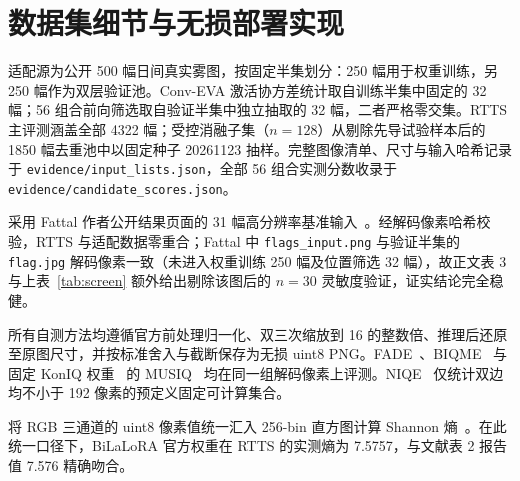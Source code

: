 \documentclass[10pt,twocolumn,letterpaper]{article}
\begin{document}
\begin{table}[H]\centering\small\setlength{\tabcolsep}{2pt}

\caption{剔除已知验证重合图 \texttt{flags\_input.png} 后的 Fattal（$n=30$）灵敏度复核结果（三种子均值$\pm$样本标准差），所有指标优势方向与 $n=31$ 完全一致。}
\label{tab:screen}
\end{table}

\clearpage
\begin{table}[H]\centering\small\setlength{\tabcolsep}{2pt}

\caption{Course-10 课程指定 10 幅真实雾图的逐图定量明细（统一无损 uint8 PNG 评测口径）。\method~在全部 10 幅图像上均取得最低残雾 FADE，并在重雾样例 \texttt{neighbour} 与 \texttt{tiananmen} 上明显优于各对比基线。}
\label{tab:course10full}
\end{table}

\clearpage
\section{数据集细节与无损部署实现}
适配源为公开 500 幅日间真实雾图，按固定半集划分：250 幅用于权重训练，另 250 幅作为双层验证池。Conv-EVA 激活协方差统计取自训练半集中固定的 32 幅；56 组合前向筛选取自验证半集中独立抽取的 32 幅，二者严格零交集。RTTS 主评测涵盖全部 4322 幅；受控消融子集（$n=128$）从剔除先导试验样本后的 1850 幅去重池中以固定种子 20261123 抽样。完整图像清单、尺寸与输入哈希记录于 \texttt{evidence/input\_lists.json}，全部 56 组合实测分数收录于 \texttt{evidence/candidate\_scores.json}。

采用 Fattal 作者公开结果页面的 31 幅高分辨率基准输入~\cite{fattal2014}。经解码像素哈希校验，RTTS 与适配数据零重合；Fattal 中 \texttt{flags\_input.png} 与验证半集的 \texttt{flag.jpg} 解码像素一致（未进入权重训练 250 幅及位置筛选 32 幅），故正文表 3 与上表~\ref{tab:screen} 额外给出剔除该图后的 $n=30$ 灵敏度验证，证实结论完全稳健。

所有自测方法均遵循官方前处理归一化、双三次缩放到 16 的整数倍、推理后还原至原图尺寸，并按标准舍入与截断保存为无损 uint8 PNG。FADE~\cite{fade2015}、BIQME~\cite{biqme2018} 与固定 KonIQ 权重~\cite{koniq2020} 的 MUSIQ~\cite{musiq2021} 均在同一组解码像素上评测。NIQE~\cite{niqe2013} 仅统计双边均不小于 192 像素的预定义固定可计算集合。

将 RGB 三通道的 uint8 像素值统一汇入 256-bin 直方图计算 Shannon 熵~\cite{shannon1948}。在此统一口径下，BiLaLoRA 官方权重在 RTTS 的实测熵为 7.5757，与文献表 2 报告值 7.576 精确吻合。
\end{document}
